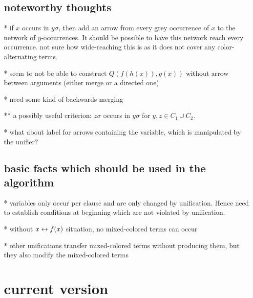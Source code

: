 \documentclass[,%
	paper=a4,%
	DIV10, %
	twoside=false,%
	liststotoc,
	bibtotoc,
	draft=false,%
	numbers=noendperiod
]{scrartcl}
\begin{document}
\newcommand{\substremarksym}{$\ast$}
\newcommand{\substremarkref}{$(\ast)$}

\newcommand{\lif}[1]{\lift{\Delta}{#1}{x}}
\newcommand{\newterm}{^*}
\newcommand{\de}{^\Delta}


\subsection*{noteworthy thoughts}

{\large

* if $x$ occurs in $y\sigma$, then add an arrow from every grey occurrence of $x$ to the network of $y$-occurrences. It should be possible to have this network reach every occurrence. not sure how wide-reaching this is as it does not cover any color-alternating terms.

}
* seem to not be able to construct $Q(f(h(x)), g(x))$ without arrow between arguments (either merge or a directed one) 

* need some kind of backwards merging

** a possibly useful criterion: $z\sigma$ occurs in $y\sigma$ for $y, z \in C_1 \cup C_2$.

* what about label for arrows containing the variable, which is manipulated by the unifier?

\subsection*{basic facts which should be used in the algorithm}

* variables only occur per clause and are only changed by unification. Hence need to establish conditions at beginning which are not violated by unification.

* without $x \leftrightarrow f(x)$ situation, no mixed-colored terms can occur

* other unifications transfer mixed-colored terms without producing them, but they also modify the mixed-colored terms




\section{current version}



\end{document}
